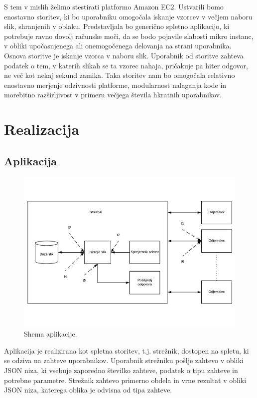S tem v mislih želimo stestirati platformo Amazon EC2.
Ustvarili bomo enostavno storitev, ki bo uporabniku omogočala iskanje vzorcev v večjem naboru slik, shranjenih v oblaku.
Predstavljala bo generično spletno aplikacijo, ki potrebuje ravno dovolj računske moči, da se bodo pojavile slabosti mikro instanc, v obliki upočasnjenega ali onemogočenega delovanja na strani uporabnika.
Osnova storitve je iskanje vzorca v naboru slik.
Uporabnik od storitve zahteva podatek o tem, v katerih slikah se ta vzorec nahaja, pričakuje pa hiter odgovor, ne več kot nekaj sekund zamika.
Taka storitev nam bo omogočala relativno enostavno merjenje odzivnosti platforme, modularnost nalaganja kode in morebitno razširljivost v primeru večjega števila hkratnih uporabnikov.

\section{Realizacija}

\subsection{Aplikacija}

\begin{figure}[H]
\centering
\includegraphics[scale=0.4]{Img/1_shema.pdf}
\caption{Shema aplikacije.}
\label{fig:1_osnovnaShema}
\end{figure}

Aplikacija je realizirana kot spletna storitev, t.j. strežnik, dostopen na spletu, ki se odziva na zahteve uporabnikov.
Uporabnik strežniku pošlje zahtevo v obliki JSON niza, ki vsebuje zaporedno številko zahteve, podatek o tipu zahteve in potrebne parametre.
Strežnik zahtevo primerno obdela in vrne rezultat v obliki JSON niza, katerega oblika je odvisna od tipa zahteve.

